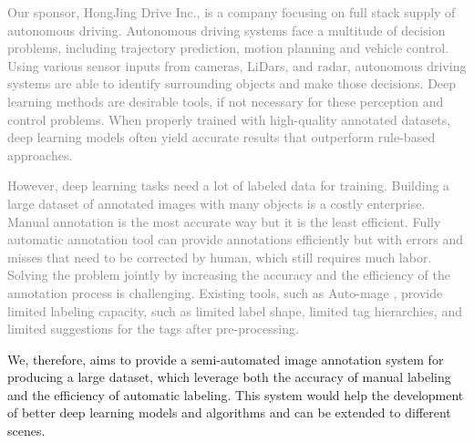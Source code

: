 \textcolor{gray}{Our sponsor, HongJing Drive Inc., is a company focusing on
full stack supply of autonomous driving. Autonomous driving systems face a
multitude of decision problems, including trajectory prediction, motion
planning and vehicle control. Using various sensor inputs from cameras, LiDars,
and radar, autonomous driving systems are able to identify surrounding objects
and make those decisions. Deep learning methods are desirable tools, if not
necessary for these perception and control problems. When properly trained with
high-quality annotated datasets, deep learning models often yield accurate
results that outperform rule-based approaches.}

\textcolor{gray}{However, deep learning tasks need a lot of labeled data for
training. Building a large dataset of annotated images with many objects is a
costly enterprise. Manual annotation is the most accurate way but it is the
least efficient. Fully automatic annotation tool can provide annotations
efficiently but with errors and misses that need to be corrected by human,
which still requires much labor. Solving the problem jointly by increasing the
accuracy and the efficiency of the annotation process is challenging. Existing
tools, such as Auto-mage \cite{annomage}, provide limited labeling capacity,
such as limited label shape, limited tag hierarchies, and limited suggestions
for the tags after pre-processing.}

We, therefore, aims to provide a semi-automated image annotation system for
producing a large dataset, which leverage both the accuracy of manual labeling
and the efficiency of automatic labeling. This system would help the
development of better deep learning models and algorithms and can be extended
to different scenes.




